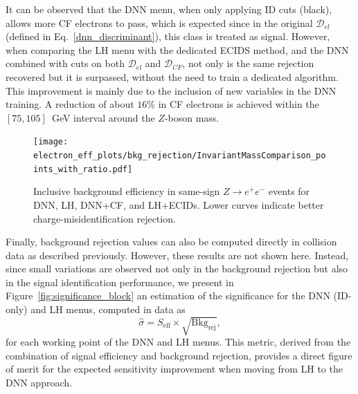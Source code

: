 It can be observed that the DNN menu, when only applying ID cuts (black), allows more CF electrons to pass, which is expected since in the original $\mathcal{D}_{el}$ (defined in Eq.~\ref{dnn_discriminant}), this class is treated as signal. However, when comparing the LH menu with the dedicated ECIDS method, and the DNN combined with cuts on both $\mathcal{D}_{el}$ and $\mathcal{D}_{CF}$, not only is the same rejection recovered but it is surpassed, without the need to train a dedicated algorithm. This improvement is mainly due to the inclusion of new variables in the DNN training. A reduction of about $16\%$ in CF electrons is achieved within the $[75,105]$~GeV interval around the $Z$-boson mass.

\begin{figure}[htbp]
  \centering
  \texttt{[image: electron\_eff\_plots/bkg\_rejection/InvariantMassComparison\_points\_with\_ratio.pdf]}
  \caption{Inclusive background efficiency in same-sign $Z\to e^{+}e^{-}$ events for DNN, LH, DNN+CF, and LH+ECIDs. Lower curves indicate better charge-misidentification rejection.}
  \label{fig:cf_bkg_data}
\end{figure}

Finally, background rejection values can also be computed directly in collision data as described previously. However, these results are not shown here. Instead, since small variations are observed not only in the background rejection but also in the signal identification performance, we present in Figure~\ref{fig:significance_block} an estimation of the significance for the DNN (ID-only) and LH menus, computed in data as
\begin{equation}
\hat{\sigma} = S_{\mathrm{eff}} \times \sqrt{\mathrm{Bkg}_{\mathrm{rej}}},
\end{equation}
for each working point of the DNN and LH menus. This metric, derived from the combination of signal efficiency and background rejection, provides a direct figure of merit for the expected sensitivity improvement when moving from LH to the DNN approach.



